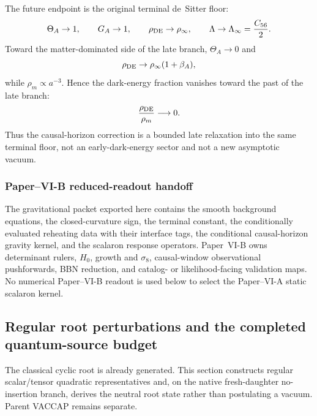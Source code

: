 \documentclass[12pt,a4paper]{article}
\begin{document}
The future endpoint is the original terminal de~Sitter floor:
\begin{equation}
\label{p8:eq:hs-attractor}
    \Theta_A\to1,\qquad
    G_A\to1,\qquad
    \rho_{\rm DE}\to\rho_\infty,
    \qquad
    \Lambda\to\Lambda_\infty=\frac{C_{56}}2.
\end{equation}
Toward the matter-dominated side of the late branch, \(\Theta_A\to0\) and
\[
    \rho_{\rm DE}\to \rho_\infty(1+\beta_A),
\]
while \(\rho_m\propto a^{-3}\).  Hence the dark-energy fraction vanishes
toward the past of the late branch:
\begin{equation}
\label{p8:eq:hs-early-late-safety}
    \frac{\rho_{\rm DE}}{\rho_m}\longrightarrow0 .
\end{equation}
Thus the causal-horizon correction is a bounded late relaxation into the same
terminal floor, not an early-dark-energy sector and not a new asymptotic
vacuum.





\subsubsection{Paper--VI-B reduced-readout handoff}
\label{p8:sec:tensions}
The gravitational packet exported here contains the smooth background equations, the closed-curvature sign, the terminal constant, the conditionally evaluated reheating data with their interface tags, the conditional causal-horizon gravity kernel, and the scalaron response operators.  Paper~VI-B owns determinant rulers, \(H_0\), growth and \(\sigma_8\), causal-window observational pushforwards, BBN reduction, and catalog- or likelihood-facing validation maps.  No numerical Paper--VI-B readout is used below to select the Paper--VI-A static scalaron kernel.

\subsection{Regular root perturbations and the completed quantum-source budget}
\label{p8:sec:v2109-root-quantum-transport}
The classical cyclic root is already generated.  This section constructs regular scalar/tensor quadratic representatives and, on the native fresh-daughter no-insertion branch, derives the neutral root state rather than postulating a vacuum.  Parent VACCAP remains separate.
\end{document}
